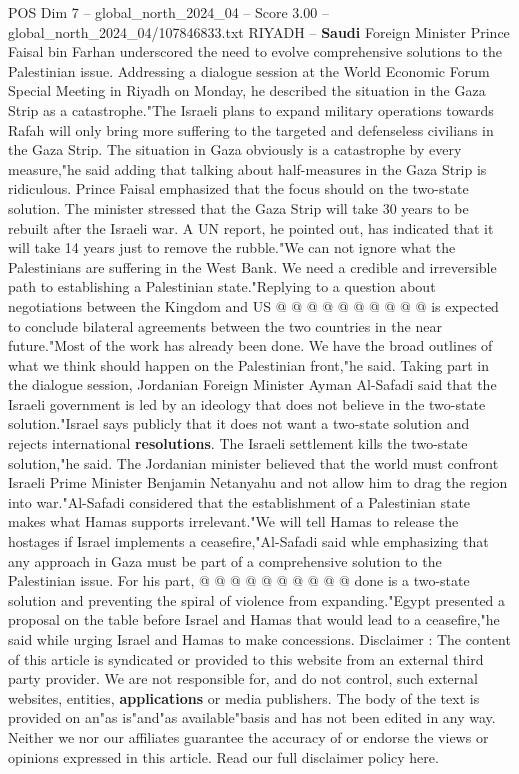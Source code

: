 \begin{textsample}{POS Dim 7 – global\_north\_2024\_04 – Score 3.00 – global\_north\_2024\_04/107846833.txt}  \label{ex:f7_pos_229}
RIYADH -- \textbf{Saudi} Foreign Minister Prince Faisal bin Farhan underscored the need to evolve comprehensive solutions to the Palestinian issue.
Addressing a dialogue session at the World Economic Forum Special Meeting in Riyadh on Monday, he described the situation in the Gaza Strip as a catastrophe."The Israeli plans to expand military operations towards Rafah will only bring more suffering to the targeted and defenseless civilians in the Gaza Strip.
The situation in Gaza obviously is a catastrophe by every measure,"he said adding that talking about half-measures in the Gaza Strip is ridiculous.
Prince Faisal emphasized that the focus should on the two-state solution.
The minister stressed that the Gaza Strip will take 30 years to be rebuilt after the Israeli war.
A UN report, he pointed out, has indicated that it will take 14 years just to remove the rubble."We can not ignore what the Palestinians are suffering in the West Bank.
We need a credible and irreversible path to establishing a Palestinian state."Replying to a question about negotiations between the Kingdom and US @ @ @ @ @ @ @ @ @ @ is expected to conclude bilateral agreements between the two countries in the near future."Most of the work has already been done.
We have the broad outlines of what we think should happen on the Palestinian front,"he said.
Taking part in the dialogue session, Jordanian Foreign Minister Ayman Al-Safadi said that the Israeli government is led by an ideology that does not believe in the two-state solution."Israel says publicly that it does not want a two-state solution and rejects international \textbf{resolutions}.
The Israeli settlement kills the two-state solution,"he said.
The Jordanian minister believed that the world must confront Israeli Prime Minister Benjamin Netanyahu and not allow him to drag the region into war."Al-Safadi considered that the establishment of a Palestinian state makes what Hamas supports irrelevant."We will tell Hamas to release the hostages if Israel implements a ceasefire,"Al-Safadi said whle emphasizing that any approach in Gaza must be part of a comprehensive solution to the Palestinian issue.
For his part, @ @ @ @ @ @ @ @ @ @ done is a two-state solution and preventing the spiral of violence from expanding."Egypt presented a proposal on the table before Israel and Hamas that would lead to a ceasefire,"he said while urging Israel and Hamas to make concessions.
Disclaimer : The content of this article is syndicated or provided to this website from an external third party provider.
We are not responsible for, and do not control, such external websites, entities, \textbf{applications} or media publishers.
The body of the text is provided on an"as is"and"as available"basis and has not been edited in any way.
Neither we nor our affiliates guarantee the accuracy of or endorse the views or opinions expressed in this article.
Read our full disclaimer policy here.

\end{textsample}
